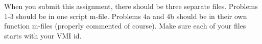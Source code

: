 When you submit this assignment, there should be three separate files.  Problems 1-3 should be in one script m-file.  Problems 4a and 4b should be in their own function m-files (properly commented of course).  Make sure each of your files starts with your VMI id.

